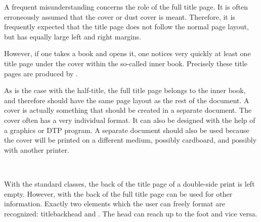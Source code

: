 \begin{Explain}
  A frequent misunderstanding concerns the role of the full title page.  It is
  often erroneously assumed that the cover or dust cover is meant.  Therefore,
  it is frequently expected that the title page does not follow the normal
  page layout, but has equally large left and right margins.

  However, if one takes a book and opens it, one notices very quickly at least
  one title page under the cover within the so-called inner book.  Precisely
  these title pages are produced by .

  As is the case with the half-title, the full title page belongs to the inner
  book, and therefore should have the same page layout as the rest of the
  document.  A cover is actually something that should be created in a
  separate document. The cover often has a very individual format. It can also
  be designed with the help of a graphics or DTP program. A separate document
  should also be used because the cover will be printed on a different medium,
  possibly cardboard, and possibly with another printer.
\end{Explain}
%
%
%
%
%
%
%
%
%
%


\begin{Declaration}
  \\
\end{Declaration}%
%
%
%
With the standard classes, the back of the title page of a double-side print
is left empty.  However, with {\KOMAScript} the back of the full title page
can be used for other information. Exactly two elements which the user can
freely format are recognized: \PName
{titlebackhead}
and . The head can reach up to the foot and vice
versa. %
%
%
%


